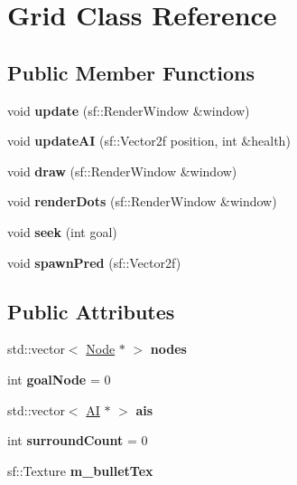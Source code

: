 \hypertarget{class_grid}{}\section{Grid Class Reference}
\label{class_grid}
\subsection*{Public Member Functions}
\begin{DoxyCompactItemize}
\item 
\mbox{\label{class_grid_a3663bc64d98e521de255d42a971072cc}} 
void {\bfseries update} (sf\+::\+Render\+Window \&window)
\item 
\mbox{\label{class_grid_aed35b0297be5c00ed36e8d27e525fdaa}} 
void {\bfseries update\+AI} (sf\+::\+Vector2f position, int \&health)
\item 
\mbox{\label{class_grid_a9b42b1d0dcfc434d790b11faf4b461ce}} 
void {\bfseries draw} (sf\+::\+Render\+Window \&window)
\item 
\mbox{\label{class_grid_aa58165416bcc766774296f0c8b057d2b}} 
void {\bfseries render\+Dots} (sf\+::\+Render\+Window \&window)
\item 
\mbox{\label{class_grid_ada242a904e942e6d4a97f458ea3e7ae7}} 
void {\bfseries seek} (int goal)
\item 
\mbox{\label{class_grid_a2e1a97e06b3d2fcc27e2ea40e80f1f85}} 
void {\bfseries spawn\+Pred} (sf\+::\+Vector2f)
\end{DoxyCompactItemize}
\subsection*{Public Attributes}
\begin{DoxyCompactItemize}
\item 
\mbox{\label{class_grid_a76523519ea42021931d2a5a1674b43ad}} 
std\+::vector$<$ \mbox{\hyperlink{class_node}{Node}} $\ast$ $>$ {\bfseries nodes}
\item 
\mbox{\label{class_grid_a89f7df50d91e3535998bc7c4185bdf49}} 
int {\bfseries goal\+Node} = 0
\item 
\mbox{\label{class_grid_a0e2434a63726be11c36d1c0cb7d37913}} 
std\+::vector$<$ \mbox{\hyperlink{class_a_i}{AI}} $\ast$ $>$ {\bfseries ais}
\item 
\mbox{\label{class_grid_ae47956131b1101bf7478d662394d43ad}} 
int {\bfseries surround\+Count} = 0
\item 
\mbox{\label{class_grid_a272eb2251ef1279b708a80628d30ddf4}} 
sf\+::\+Texture {\bfseries m\+\_\+bullet\+Tex}
\end{DoxyCompactItemize}
